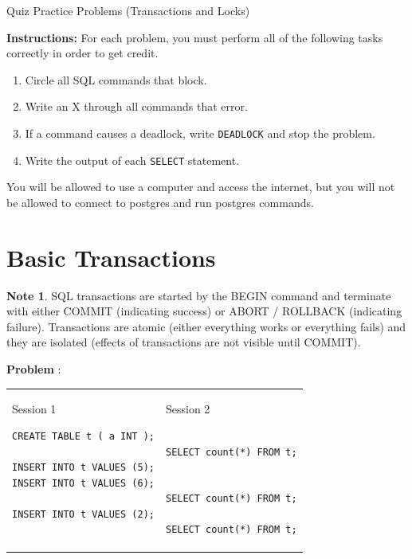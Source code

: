 \documentclass[10pt]{article}
\theoremstyle{definition}
\newtheorem{note}{Note}
\newcounter{ProblemCounter}
\newcommand{\nextproblem}{\filbreak\stepcounter{ProblemCounter} \noindent\textbf{Problem \theProblemCounter}:}
\begin{document}
\begin{center}
{
\Large
    Quiz Practice Problems (Transactions and Locks)
}

    \vspace{0.1in}
\end{center}

\noindent
\textbf{Instructions:}
For each problem, you must perform all of the following tasks correctly in order to get credit.
\begin{enumerate}
\item Circle all SQL commands that block.
\item Write an X through all commands that error.
\item If a command causes a deadlock, write \lstinline{DEADLOCK} and stop the problem.
\item Write the output of each \lstinline{SELECT} statement.
\end{enumerate}
    You will be allowed to use a computer and access the internet, but you will not be allowed to connect to postgres and run postgres commands.

\section{Basic Transactions}

\begin{note}
SQL transactions are started by the BEGIN command and terminate with either COMMIT (indicating success) or ABORT / ROLLBACK (indicating failure).
Transactions are atomic (either everything works or everything fails) and they are isolated (effects of transactions are not visible until COMMIT).
\end{note}

\nextproblem
\begin{tcolorbox}
\begin{tabular}{p{3.25in}p{3in}}
\hspace{-0.2in}Session 1
\begin{lstlisting}
CREATE TABLE t ( a INT );

INSERT INTO t VALUES (5);
INSERT INTO t VALUES (6);

INSERT INTO t VALUES (2);
  
\end{lstlisting}
    &
\hspace{-0.2in}Session 2
\begin{lstlisting}

SELECT count(*) FROM t;


SELECT count(*) FROM t;

SELECT count(*) FROM t;
\end{lstlisting}
\end{tabular}
\vspace{-0.2in}
\end{tcolorbox}
\vspace{0.25in}
\end{document}
